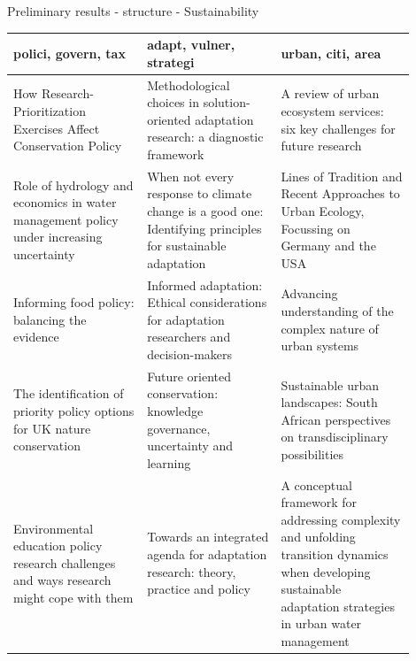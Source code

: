 \documentclass[9pt]{beamer}
\begin{document}
\begin{frame}{Preliminary results - structure - Sustainability}
\begin{table}
	\footnotesize
	\renewcommand{\arraystretch}{2}
\begin{tabular}{p{0.3\linewidth}p{0.3\linewidth}p{0.3\linewidth}}
	\toprule 
	{polici, govern, tax} & {adapt, vulner, strategi}  & {urban, citi, area} \\ 
	\midrule 
	How Research-Prioritization Exercises Affect Conservation Policy & Methodological choices in solution-oriented adaptation research: a diagnostic framework & A review of urban ecosystem services: six key challenges for future research  \\ 
	Role of hydrology and economics in water management policy under increasing uncertainty & When not every response to climate change is a good one: Identifying principles for sustainable adaptation & Lines of Tradition and Recent Approaches to Urban Ecology, Focussing on Germany and the USA \\ 
	Informing food policy: balancing the evidence & Informed adaptation: Ethical considerations for adaptation researchers and decision-makers & Advancing understanding of the complex nature of urban systems \\ 
	The identification of priority policy options for UK nature conservation & Future oriented conservation: knowledge governance, uncertainty and learning & Sustainable urban landscapes: South African perspectives on transdisciplinary possibilities \\ 
	Environmental education policy research challenges and ways research might cope with them & Towards an integrated agenda for adaptation research: theory, practice and policy & A conceptual framework for addressing complexity and unfolding transition dynamics when developing sustainable adaptation strategies in urban water management \\
	\bottomrule
\end{tabular} 

\end{table}

\end{frame}
\end{document}
